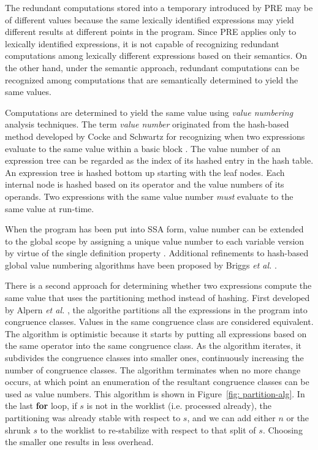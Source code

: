 The redundant computations stored into a temporary introduced by PRE may
be of different values because the same lexically identified expressions may
yield different results at different points in the program.
Since PRE applies only to lexically identified expressions, it is not capable
of recognizing redundant computations among lexically different expressions
based on their semantics.  On the other hand, under the semantic approach, 
redundant computations can be recognized among computations that are 
semantically determined to yield the same values.

Computations are determined to yield the same value using \emph{value numbering}
analysis techniques.  The term \emph{value number} originated from the 
hash-based method developed by Cocke and Schwartz for recognizing when two
expressions evaluate to the same value within a basic block \cite{CS70}.  
The value number of an expression tree can be regarded as the index of its
hashed entry in the hash table.  
An expression tree is hashed bottom up starting with the leaf nodes.  
Each internal node is hashed based on its operator and the value numbers of 
its operands.  Two expressions with the same
value number \emph{must} evaluate to the same value at run-time.

When the program has been put into SSA form, value number can be extended to the
global scope by assigning a unique value number to each variable version by
virtue of the single definition property \cite{Rosen88}.  Additional 
refinements to hash-based global value numbering algorithms have been proposed
by Briggs {\it et al.} \cite{Briggs97}.

There is a second approach for determining whether two expressions compute the
same value that uses the partitioning method instead of hashing. 
First developed by
Alpern {\it et al.} \cite{AWZ88}, the algorithe partitions all the expressions
in the program into congruence classes.  Values in the same congruence class 
are considered equivalent.  The algorithm is optimistic because it
starts by putting all expressions based on the same operator into the same
congruence class.  As the algorithm iterates, it subdivides the congruence
classes into smaller ones, continuously increasing the number of congruence
classes.  The algorithm terminates when no more change occurs,
at which point an enumeration of the resultant congruence classes can be
used as value numbers.  This algorithm is shown in 
Figure~\ref{fig: partition-alg}. In the last {\bf for} loop, if $s$ is not in
the worklist (i.e. processed already), the partitioning was already stable 
with respect to $s$, and
we can add either $n$ or the shrunk $s$ to the worklist to re-stabilize with
respect to that split of $s$.  Choosing the smaller one results in less
overhead.

